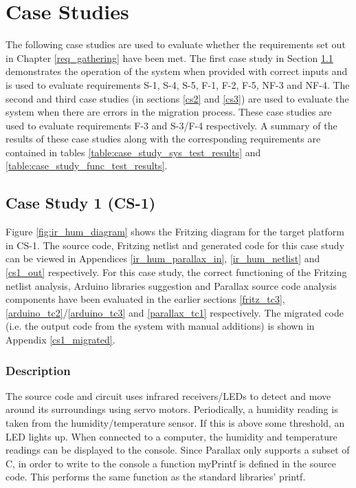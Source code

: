 \documentclass{UoYCSproject}
\begin{document}
\section{Case Studies} \label{eval_case_studies}
The following case studies are used to evaluate whether the requirements set out in Chapter \ref{req_gathering} have been met. The first case study in Section \ref{cs1} demonstrates the operation of the system when provided with correct inputs and is used to evaluate requirements S-1, S-4, S-5, F-1, F-2, F-5, NF-3 and NF-4. The second and third case studies (in sections \ref{cs2} and \ref{cs3}) are used to evaluate the system when there are errors in the migration process. These case studies are used to evaluate requirements F-3 and S-3/F-4 respectively. A summary of the results of these case studies along with the corresponding requirements are contained in tables \ref{table:case_study_sys_test_results} and \ref{table:case_study_func_test_results}.

\subsection{Case Study 1 (CS-1)} \label{cs1}
Figure \ref{fig:ir_hum_diagram} shows the Fritzing diagram for the target platform in CS-1. The source code, Fritzing netlist and generated code for this case study can be viewed in Appendices \ref{ir_hum_parallax_in}, \ref{ir_hum_netlist} and \ref{cs1_out} respectively. For this case study, the correct functioning of the Fritzing netlist analysis, Arduino libraries suggestion and Parallax source code analysis components have been evaluated in the earlier sections \ref{fritz_tc3}, \ref{arduino_tc2}/\ref{arduino_tc3} and \ref{parallax_tc1} respectively. The migrated code (i.e. the output code from the system with manual additions) is shown in Appendix \ref{cs1_migrated}.

\subsubsection{Description} \label{cs1_description}
The source code and circuit uses infrared receivers/LEDs to detect and move around its surroundings using servo motors. Periodically, a humidity reading is taken from the humidity/temperature sensor. If this is above some threshold, an LED lights up. When connected to a computer, the humidity and temperature readings can be displayed to the console. Since Parallax only supports a subset of C, in order to write to the console a function myPrintf is defined in the source code. This performs the same function as the standard libraries' printf.
\end{document}
